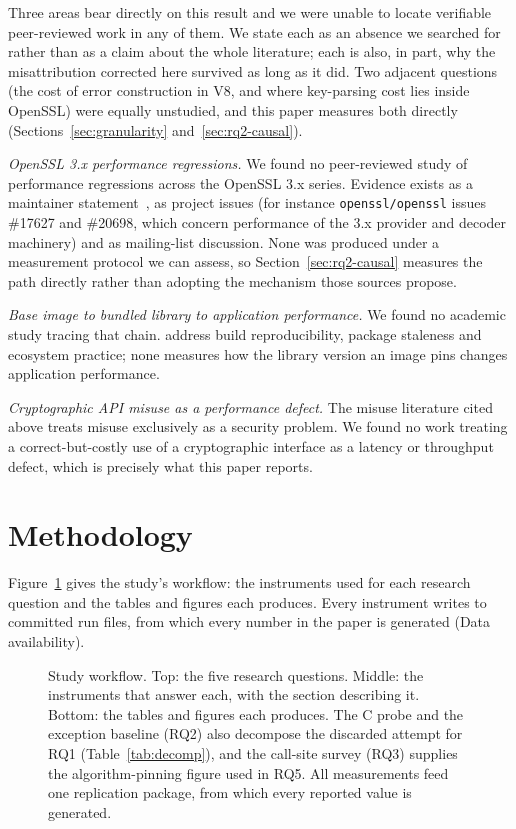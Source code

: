 \documentclass[preprint,12pt,authoryear]{elsarticle}
\begin{document}
Three areas bear directly on this result and we were unable to locate
verifiable peer-reviewed work in any of them. We state each as an absence we
searched for rather than as a claim about the whole literature; each is also,
in part, why the misattribution corrected here survived as long as it did.
Two adjacent questions (the cost of error construction in V8, and where
key-parsing cost lies inside OpenSSL) were equally unstudied, and this paper
measures both directly (Sections~\ref{sec:granularity}
and~\ref{sec:rq2-causal}).

\emph{OpenSSL 3.x performance regressions.} We found no peer-reviewed study of
performance regressions across the OpenSSL 3.x series. Evidence exists as a
maintainer statement~\citep{pyca2026stateofopenssl}, as project issues (for
instance \texttt{openssl/openssl} issues \#17627 and \#20698, which concern
performance of the 3.x provider and decoder machinery) and as mailing-list
discussion. None was produced under a measurement protocol we can assess, so
Section~\ref{sec:rq2-causal} measures the path directly rather than adopting
the mechanism those sources propose.

\emph{Base image to bundled library to application performance.} We found no
academic study tracing that chain. \citet{malka2026docker} address
build reproducibility, \citet{zerouali2019outdated} package
staleness and \citet{cito2017empirical} ecosystem practice; none
measures how the library version an image pins changes application
performance.

\emph{Cryptographic API misuse as a performance defect.} The misuse literature
cited above treats misuse exclusively as a security problem. We found no work
treating a correct-but-costly use of a cryptographic interface as a latency or
throughput defect, which is precisely what this paper reports.

\section{Methodology}\label{sec:method}

Figure~\ref{fig:workflow} gives the study's workflow: the instruments used for
each research question and the tables and figures each produces. Every
instrument writes to committed run files, from which every number in the paper
is generated (Data availability).

\begin{figure}[!t]
\centering
\resizebox{\linewidth}{!}{}
\caption{Study workflow. Top: the five research questions. Middle: the
instruments that answer each, with the section describing it. Bottom: the
tables and figures each produces. The C probe and the exception baseline
(RQ2) also decompose the discarded attempt for RQ1 (Table~\ref{tab:decomp}),
and the call-site survey (RQ3) supplies the algorithm-pinning figure used in
RQ5. All measurements feed one replication package, from which every reported
value is generated.}
\label{fig:workflow}
\end{figure}
\end{document}
